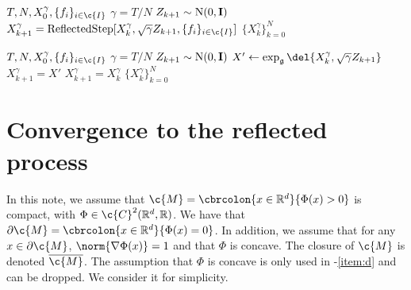\begin{algorithm}[H]
	\caption{\emph{Reflected Random Walk}.
		Discretisation of the SDE $\mathrm{d} \v{X}_t = b(t, \v{X}_t) \mathrm{d} t + \mathrm{d} \v{B}_t - \mathrm{d} \v{k}_t$.
	}
	\label{alg:app_reflected_random_walk}
	\begin{algorithmic}
		 $T, N, X_0^\gamma, \{f_i\}_{i \in \c{I}}$
		\State $\gamma = T / N$
		\State $Z_{k+1} \sim \mathrm{N}(0, \m{I})$
		\State $X_{k+1}^\gamma = \text{ReflectedStep}[X_{k}^\gamma, \sqrt{\gamma}
			Z_{k+1}, \{f_i\}_{i \in \c{I}}]$ \EndFor {} $\{ X_k^\gamma\}_{k=0}^{N}$ \end{algorithmic} \end{algorithm} \begin{algorithm} \caption{\emph{Metropolis Random Walk}.
		Discretisation of the SDE $\mathrm{d} \v{X}_t = b(t, \v{X}_t) \mathrm{d} t + \mathrm{d} \v{B}_t - \mathrm{d} \v{k}_t$.
	}
	\label{alg:app_metropolis_random_walk}
	\begin{algorithmic}
		 $T, N, X_0^\gamma, \{f_i\}_{i \in \c{I}}$
		\State $\gamma = T / N$
		\State $Z_{k+1} \sim \mathrm{N}(0, \m{I})$
		\State \(X' \gets \exp_\mathfrak{g}\del{X_{k}^\gamma, \sqrt{\gamma}
			Z_{k+1}}\)  \State $X_{k+1}^\gamma = X'$ \Else \State $X_{k+1}^\gamma = X_{k}^\gamma$ \EndIf \EndFor {} $\{ X_k^\gamma\}_{k=0}^{N}$ \end{algorithmic} \end{algorithm} \section{Convergence to the reflected process}\label{sec:rejection-convergence} \def \Kker {\mathrm{K}} In this note, we assume that $\c{M} = \cbrcolon{x \in \R^d}{\Phi(x) > 0}$ is compact, with $\Phi \in \c{C}^2(\R^d, \R)$.
We have that $\partial \c{M} = \cbrcolon{x \in \R^d}{\Phi(x) = 0}$.
In addition, we assume that for any $x \in \partial \c{M}$, $\norm{\nabla \Phi(x)} = 1$ and that $\Phi$ is concave.
The closure of $\c{M}$ is denoted $\cl{\c{M}}$.
The assumption that $\Phi$ is concave is only used in -\ref{item:d} and can be dropped.
We consider it for simplicity.

